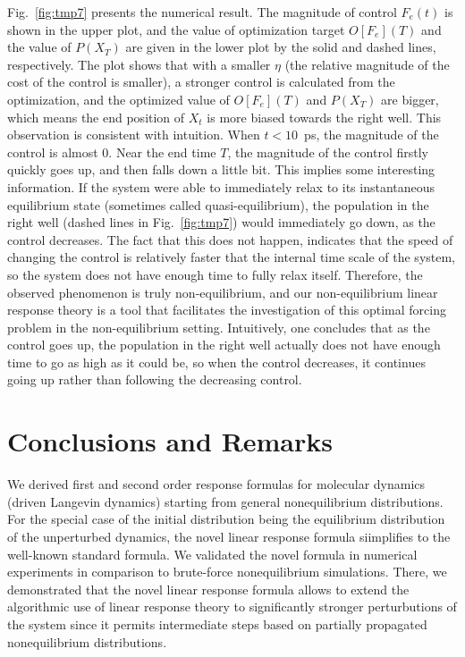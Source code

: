 \documentclass[]{tMPH2e}
\begin{document}
Fig.~\ref{fig:tmp7} presents the numerical result. The magnitude of
control $F_e(t)$ is shown in the upper plot, and the value of
optimization target $O[F_e](T)$ and the value of $P( X_T)$ are
given in the lower plot by the solid and dashed lines, respectively.
The plot shows that with a smaller $\eta$ (the relative magnitude of
the cost of the control is smaller), a stronger control is calculated
from the optimization, and the optimized value of $O[F_e](T)$ and
$P( X_T)$ are bigger, which means the end position of $ X_t$
is more biased towards the right well. This observation is consistent
with intuition.  When $t<10$~ps, the magnitude of the control is
almost 0.  Near the end time $T$, the magnitude of the control firstly
quickly goes up, and then falls down a little bit.  This implies some
interesting information.  If the system were able to immediately relax
to its instantaneous equilibrium state (sometimes called
quasi-equilibrium), the population in the right well (dashed lines in
Fig.~\ref{fig:tmp7}) would immediately go down, as the control
decreases.  The fact that this does not happen, indicates that the
speed of changing the control is relatively faster that the internal
time scale of the system, so the system does not have enough time to
fully relax itself. Therefore, the observed phenomenon is truly
non-equilibrium, and our non-equilibrium linear response theory is a
tool that facilitates the investigation of this optimal forcing
problem in the non-equilibrium setting.  Intuitively, one concludes
that as the control goes up, the population in the right well actually
does not have enough time to go as high as it could be, so when the
control decreases, it continues going up rather than following the
decreasing control.




\section{Conclusions and Remarks}

We derived  first and second order response formulas for molecular dynamics (driven Langevin dynamics) starting from general nonequilibrium distributions. For the special case of the initial distribution being the equilibrium distribution of the unperturbed dynamics, the novel linear response formula siimplifies to the well-known standard formula. We validated the novel formula in numerical experiments in comparison to brute-force nonequilibrium simulations. There, we demonstrated that the novel linear response formula allows to extend the algorithmic use of linear response theory to significantly stronger perturbutions of the system since it permits intermediate steps based on partially propagated nonequilibrium distributions. 
\end{document}
